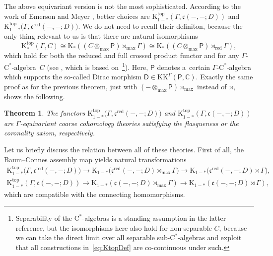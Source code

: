 \documentclass[pdftex]{sigma}
\numberwithin{equation}{section}
\newtheorem{thm}{Theorem}[section]
\theoremstyle{definition}
\newcommand{\C}{\mathbb{C}}
\newcommand{\maxtensor}{\mathbin{{\otimes}_{\mathrm{max}}}}
\newcommand{\maxcrossed}{\mathbin{{\rtimes}_{\mathrm{max}}}}
\newcommand{\redcrossed}{\mathbin{{\rtimes}_{\mathrm{red}}}}
\newcommand{\K}{\mathrm{K}}
\newcommand{\Ktop}{\mathrm{K}^{\mathrm{top}}}
\newcommand{\KK}{\mathrm{KK}}
\newcommand{\textCstar}{\ensuremath{\mathrm{C}^*\!}}
\newcommand{\sHigCor}{\mathfrak{c}}
\newcommand{\sHigCorRed}{\mathfrak{c}^{\mathrm{red}}}
\newcommand{\sfP}{\mathsf{P}}
\newcommand{\sfD}{\mathsf{D}}
\newcommand{\blank}{-}
\begin{document}
The above equivariant version is not the most sophisticated. According to the work of Emerson and Meyer \cite{EmeMeyDescent,EmeMeyEquivariantCoassembly}, better choices are $\Ktop_{1-*}(\Gamma,\sHigCor(-,-;D))$ and $\Ktop_{1-*}\big(\Gamma,\sHigCorRed(-,-;D)\big)$.
We do not need to recall their definiton, because the only thing relevant to us is that there are natural isomorphisms
\begin{equation}\label{eq:KtopDef}
\Ktop_*(\Gamma,C)\cong \K_*((C\maxtensor\sfP)\maxcrossed\Gamma)\cong \K_*((C\maxtensor\sfP)\redcrossed\Gamma),
\end{equation}
which hold for both the reduced and full crossed product functor and for any $\Gamma$-\textCstar-algebra~$C$ (see \cite[Theorem~22]{EmeMeyDescent}, which is based on~\cite[Theorems~5.2 and~10.2]{MeyerNest}\footnote{Separability of the \textCstar-algebras is a standing assumption in the latter reference, but the isomorphisms here also hold for non-separable $C$, because we can take the direct limit over all separable sub-\textCstar-algebras and exploit that all constructions in~\eqref{eq:KtopDef} are co-continuous under such.}). Here, $\sfP$ denotes a~certain $\Gamma$-\textCstar-algebra which supports the so-called Dirac morphism $\sfD\in\KK^\Gamma(\sfP,\C)$.
Exactly the same proof as for the previous theorem, just with $(\blank\maxtensor\sfP)\maxcrossed$ instead of $\rtimes$, shows the following.

\begin{thm}
The functors $\Ktop_{1-*}\big(\Gamma,\sHigCorRed(-,-;D)\big)$ and $\Ktop_{1-*}(\Gamma,\sHigCor(-,-;D))$ are $\Gamma$-equivariant coarse cohomology theories satisfying the flasqueness or the coronality axiom, respectively.
\end{thm}

Let us briefly discuss the relation between all of these theories. First of all, the Baum--Connes assembly map yields natural transformations
\begin{gather*}
\Ktop_{1-*}\big(\Gamma,\sHigCorRed(-,-;D)\big)\to \K_{1-*}\big(\sHigCorRed(-,-;D)\maxcrossed\Gamma\big)\to \K_{1-*}\big(\sHigCorRed(-,-;D)\rtimes\Gamma\big),
\\[.5ex]
\Ktop_{1-*}(\Gamma,\sHigCor(-,-;D))\to \K_{1-*}(\sHigCor(-,-;D)\maxcrossed\Gamma)\to \K_{1-*}(\sHigCor(-,-;D)\rtimes\Gamma),
\end{gather*}
which are compatible with the connecting homomorphisms.
\end{document}
